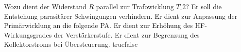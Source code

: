     {Wozu dient der Widerstand $R$ parallel zur Trafowicklung $T\_2$?}
    {Er soll die Entstehung parasitärer Schwingungen verhindern.}
    {Er dient zur Anpassung der Primärwicklung an die folgende PA.}
    {Er dient zur Erhöhung des HF-Wirkungsgrades der Verstärkerstufe.}
    {Er dient zur Begrenzung des Kollektorstroms bei Übersteuerung.}
    {true}{false}